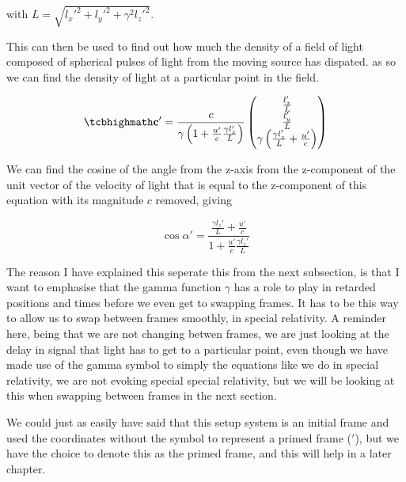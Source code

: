 with $ L=\sqrt{l_x'^2+l_y'^2+\gamma^2 l_z'^2}$.

This can then be used to find out how much the density of a field of light composed of spherical pulses of light from the moving source has dispated. as so we can find the density of light at a particular point in the field.

\begin{equation}
	\label{eq: direction of light from moving source}
	\mhl{
		\mathbf{c'} =
		\frac{c}{ \gamma \left( 1 + \frac{u'}{c} \frac{\gamma l_z'}{L} \right) }
	\begin{pmatrix}
		 \frac{l_x'}{L} \\
		 \frac{l_y'}{L} \\
		\gamma \left( \frac{\gamma l_z'}{L} + \frac{u'}{c} \right)
	\end{pmatrix}
	}
\end{equation}

We can find the cosine of the angle from the z-axis from the z-component of the unit vector of the velocity of light that is equal to the z-component of this equation with its magnitude $c$ removed, giving

\begin{equation}
	\label{eq: cos alpha prime in terms of l}
	\cos{\alpha'} = \frac{ \frac{\gamma l_z'}{L} + \frac{u'}{c}}{ 1 + \frac{u'}{c} \frac{\gamma l_z'}{L}}
\end{equation}

The reason I have explained this seperate this from the next subsection, is that I want to emphasise that the gamma function $\gamma$ has a role to play in retarded positions and times before we even get to swapping frames.
It has to be this way to allow us to swap between frames smoothly, in special relativity.
A reminder here, being that we are not changing betwen frames, we are just looking at the delay in signal that light has to get to a particular point, even though we have made use of the gamma symbol to simply the equations like we do in special relativity, we are not evoking special special relativity, but we will be looking at this when swapping between frames in the next section.

We could just as easily have said that this setup system is an initial frame and used the coordinates without the symbol to represent a primed frame ($'$), but we have the choice to denote this as the primed frame, and this will help in a later chapter.

